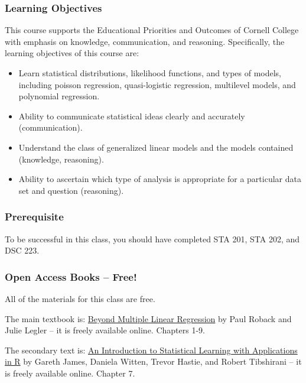 \documentclass[
  letterpaper,
  DIV=11,
  numbers=noendperiod]{scrartcl}
\begin{document}
\subsubsection{Learning Objectives}\label{learning-objectives}

This course supports the Educational Priorities and Outcomes of Cornell
College with emphasis on knowledge, communication, and reasoning.
Specifically, the learning objectives of this course are:

\begin{itemize}
\item
  Learn statistical distributions, likelihood functions, and types of
  models, including poisson regression, quasi-logistic regression,
  multilevel models, and polynomial regression.
\item
  Ability to communicate statistical ideas clearly and accurately
  (communication).
\item
  Understand the class of generalized linear models and the models
  contained (knowledge, reasoning).
\item
  Ability to ascertain which type of analysis is appropriate for a
  particular data set and question (reasoning).
\end{itemize}

\subsubsection{Prerequisite}\label{prerequisite}

To be successful in this class, you should have completed STA 201, STA
202, and DSC 223.

\subsubsection{Open Access Books -- Free!}\label{open-access-books-free}

All of the materials for this class are free.

The main textbook is:
\href{https://bookdown.org/roback/bookdown-BeyondMLR/}{Beyond Multiple
Linear Regression} by Paul Roback and Julie Legler -- it is freely
available online. Chapters 1-9.

The secondary text is:
\href{https://hastie.su.domains/ISLR2/ISLRv2_corrected_June_2023.pdf.download.html}{An
Introduction to Statistical Learning with Applications in R} by Gareth
James, Daniela Witten, Trevor Hastie, and Robert Tibshirani -- it is
freely available online. Chapter 7.
\end{document}
